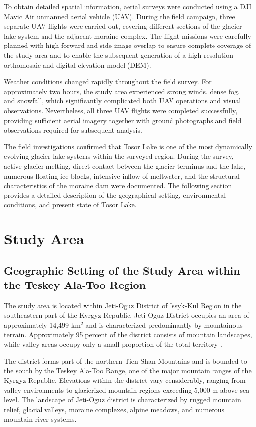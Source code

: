 \documentclass[12pt,a4paper]{report}
\begin{document}
To obtain detailed spatial information, aerial surveys were conducted using a DJI Mavic Air unmanned aerial vehicle (UAV). During the field campaign, three separate UAV flights were carried out, covering different sections of the glacier-lake system and the adjacent moraine complex. The flight missions were carefully planned with high forward and side image overlap to ensure complete coverage of the study area and to enable the subsequent generation of a high-resolution orthomosaic and digital elevation model (DEM).

Weather conditions changed rapidly throughout the field survey. For approximately two hours, the study area experienced strong winds, dense fog, and snowfall, which significantly complicated both UAV operations and visual observations. Nevertheless, all three UAV flights were completed successfully, providing sufficient aerial imagery together with ground photographs and field observations required for subsequent analysis.

The field investigations confirmed that Tosor Lake is one of the most dynamically evolving glacier-lake systems within the surveyed region. During the survey, active glacier melting, direct contact between the glacier terminus and the lake, numerous floating ice blocks, intensive inflow of meltwater, and the structural characteristics of the moraine dam were documented. The following section provides a detailed description of the geographical setting, environmental conditions, and present state of Tosor Lake.

\section{Study Area}

\subsection{Geographic Setting of the Study Area within the Teskey Ala-Too Region}

The study area is located within Jeti-Oguz District of Issyk-Kul Region in the southeastern part of the Kyrgyz Republic. Jeti-Oguz District occupies an area of approximately 14,499 km$^2$ and is characterized predominantly by mountainous terrain. Approximately 95 percent of the district consists of mountain landscapes, while valley areas occupy only a small proportion of the total territory \cite{MESKR2024}. 

The district forms part of the northern Tien Shan Mountains and is bounded to the south by the Teskey Ala-Too Range, one of the major mountain ranges of the Kyrgyz Republic. Elevations within the district vary considerably, ranging from valley environments to glacierized mountain regions exceeding 5,000 m above sea level. The landscape of Jeti-Oguz district is characterized by rugged mountain relief, glacial valleys, moraine complexes, alpine meadows, and numerous mountain river systems. 
\end{document}
